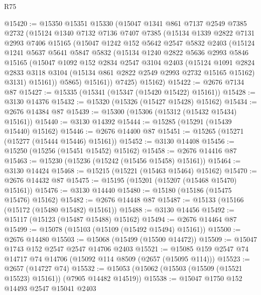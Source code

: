 \begin{lexlean}{R75}
\begin{coremodule}
@15420 := @15350
    @15351
    @15330
    (@15047
      @1341
      @861
      @7137
      @2549
      @7385
      @2732
      (@15124
        @1340
        @7132
        @7136
        @7407
        @7385
        (@15134
          @1339
          @2822
          @7131
          @2993
          @7406
          @15165
          (@15047
            @1242
            @152
            @5642
            @2547
            @5832
            @2403
            (@15124
              @1241
              @5637
              @5641
              @5847
              @5832
              (@15134
                @1240
                @2822
                @5636
                @2993
                @5846
                @15165
                (@15047
                  @1092
                  @152
                  @2834
                  @2547
                  @3104
                  @2403
                  (@15124
                    @1091
                    @2824
                    @2833
                    @3118
                    @3104
                    (@15134 @861 @2822 @2549 @2993 @2732 @15165 @15162)
                    @3131)
                  @15161))
              @5865)
            @15161))
        @7425)
      @15162)
@15422 := @2676 @7134 @87
@15427 := @15335 (@15341 (@15347 (@15420 @15422) @15161))
@15428 := @3130 @14376
@15432 := @15320 (@15326 (@15427 @15428) @15162)
@15434 := @2676 @14384 @87
@15439 := @15300 (@15306 (@15312 (@15432 @15434) @15161))
@15440 := @3130 @14392
@15444 := @15285 (@15291 (@15439 @15440) @15162)
@15446 := @2676 @14400 @87
@15451 := @15265 (@15271 (@15277 (@15444 @15446) @15161))
@15452 := @3130 @14408
@15456 := @15250 (@15256 (@15451 @15452) @15162)
@15458 := @2676 @14416 @87
@15463 := @15230 (@15236 (@15242 (@15456 @15458) @15161))
@15464 := @3130 @14424
@15468 := @15215 (@15221 (@15463 @15464) @15162)
@15470 := @2676 @14432 @87
@15475 := @15195 (@15201 (@15207 (@15468 @15470) @15161))
@15476 := @3130 @14440
@15480 := @15180 (@15186 (@15475 @15476) @15162)
@15482 := @2676 @14448 @87
@15487 := @15133 (@15166 (@15172 (@15480 @15482) @15161))
@15488 := @3130 @14456
@15492 := @15117 (@15123 (@15487 @15488) @15162)
@15494 := @2676 @14464 @87
@15499 := @15078 (@15103 (@15109 (@15492 @15494) @15161))
@15500 := @2676 @14480
@15503 := @15068 (@15499 (@15500 @14472))
@15509 := @15047 @1743 @152 @2547 @2547 @14706 @2403
@15521 := @15085 @159 @2547 @74 @14717 @74 @14706 (@15092 @114 @8509 (@2657 (@15095 @114)))
@15523 := @2657 (@14727 @74)
@15532 := @15053 (@15062 (@15503 (@15509 (@15521 @15523) @15161)) (@7905 @14482 @14519))
@15538 := @15047 @1750 @152 @14493 @2547 @15041 @2403

\end{coremodule}
\end{lexlean}
